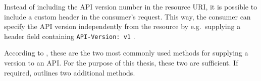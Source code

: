 Instead of including the \ac{API} version number in the resource \ac{URI}, it
is possible to include a custom header in the consumer's request. This way, the
consumer can specify the \ac{API} version independently from the resource by
e.g.\ supplying a header field containing \texttt{API-Version: v1}
\autocite{MicrosoftAPIdesign2018}.

According to \autocite{MicrosoftAPIdesign2018}, these are the two most commonly
used methods for supplying a version to an \ac{API}. For the purpose of this
thesis, these two are sufficient. If required,
\autocite{MicrosoftAPIdesign2018} outlines two additional methods.
